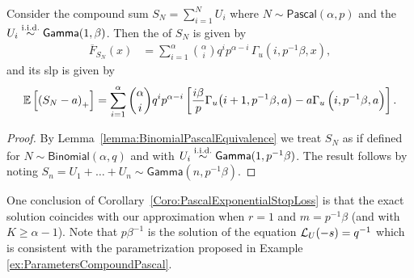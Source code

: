 \begin{corollary} \label{Coro:PascalExponentialStopLoss}
Consider the compound sum $S_N = \sum_{i=1}^N U_i$ where $N \sim \mathsf{Pascal}(\alpha,p)$ and the $U_i \overset{\mathrm{i.i.d.}}{\sim}\mathsf{Gamma}(1,\beta)$.
Then the \svf of $S_N$ is given by
\begin{align*}
\overline{F}_{S_N}(x) &= \sum_{i=1}^\alpha \binom{\alpha}{i} q^i p^{\alpha-i} \, \Gamma_u\left(i, p^{-1}\beta, x\right),
\end{align*}
and its slp is given by
\begin{equation*}\label{eq:StopLossCompoundNegBinExp}
\mathbb E\left[\left(S_N-a\right)_{+}\right] = \sum_{i=1}^\alpha \binom{\alpha}{i} q^i p^{\alpha-i} \left[ \frac{i\beta}{p } \Gamma_u\big(i+1, p^{-1} \beta , a \big) - a \Gamma_u\left(i, p^{-1}\beta , a\right) \right].
\end{equation*}
\end{corollary}
\begin{proof}
By Lemma~\ref{lemma:BinomialPascalEquivalence} we treat $S_N$ as if defined for $N \sim \mathsf{Binomial}(\alpha,q)$ and with $U_i \overset{\mathrm{i.i.d.}}{\sim} \mathsf{Gamma}(1,p^{-1} \beta)$.
The result follows by noting $S_n = U_1 + \dots + U_n \sim \mathsf{Gamma}(n, p^{-1} \beta)$.
\end{proof}
One conclusion of Corollary~\ref{Coro:PascalExponentialStopLoss} is that the exact solution coincides with our approximation when $r=1$ and $m=p^{-1}\beta$ (and with $K \ge \alpha - 1$). Note that $p\beta^{-1}$ is the solution of the equation $\mathcal{L}_{U}(-s)=q^{-1}$ which is consistent with the parametrization proposed in Example \ref{ex:ParametersCompoundPascal}.\\

